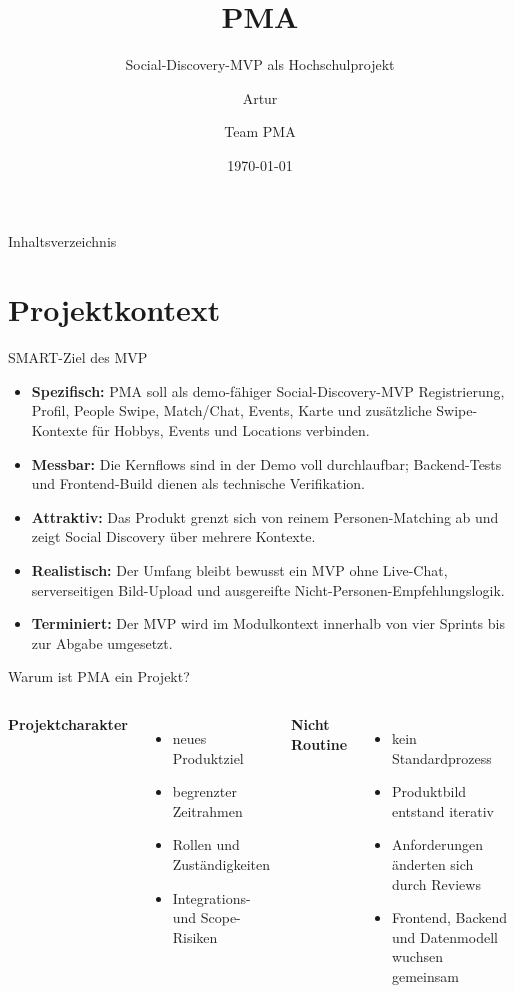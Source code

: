 \documentclass[
amberg,
compressedtitleimages,
toc=fancy,
footlinebox,
nometaot
]{OTHAWbeamer}
\title[PMA]{PMA}
\subtitle{Social-Discovery-MVP als Hochschulprojekt}
\author{Artur \and Team PMA}
\institute{OTH Amberg-Weiden}
\date{\today}
\begin{document}
\maketitle

\begin{frame}{Inhaltsverzeichnis}
  \tableofcontents
\end{frame}

\section{Projektkontext}

\begin{frame}{SMART-Ziel des MVP}
  \begin{itemize}
    \item \textbf{Spezifisch:} PMA soll als demo-fähiger Social-Discovery-MVP Registrierung, Profil, People Swipe, Match/Chat, Events, Karte und zusätzliche Swipe-Kontexte für Hobbys, Events und Locations verbinden.
    \item \textbf{Messbar:} Die Kernflows sind in der Demo voll durchlaufbar; Backend-Tests und Frontend-Build dienen als technische Verifikation.
    \item \textbf{Attraktiv:} Das Produkt grenzt sich von reinem Personen-Matching ab und zeigt Social Discovery über mehrere Kontexte.
    \item \textbf{Realistisch:} Der Umfang bleibt bewusst ein MVP ohne Live-Chat, serverseitigen Bild-Upload und ausgereifte Nicht-Personen-Empfehlungslogik.
    \item \textbf{Terminiert:} Der MVP wird im Modulkontext innerhalb von vier Sprints bis zur Abgabe umgesetzt.
  \end{itemize}
\end{frame}

\begin{frame}{Warum ist PMA ein Projekt?}
  \begin{columns}[T]
    \textbf{Projektcharakter}
    \begin{itemize}
      \item neues Produktziel
      \item begrenzter Zeitrahmen
      \item Rollen und Zuständigkeiten
      \item Integrations- und Scope-Risiken
    \end{itemize}

    \textbf{Nicht Routine}
    \begin{itemize}
      \item kein Standardprozess
      \item Produktbild entstand iterativ
      \item Anforderungen änderten sich durch Reviews
      \item Frontend, Backend und Datenmodell wuchsen gemeinsam
    \end{itemize}
  \end{columns}
\end{frame}
\end{document}
